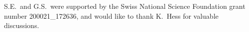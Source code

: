 \begin{ack}

  S.E.\ and G.S.\ were supported by the Swiss National Science Foundation grant number 200021\_172636, and would like to thank K.\ Hess for valuable discussions.

\end{ack}
